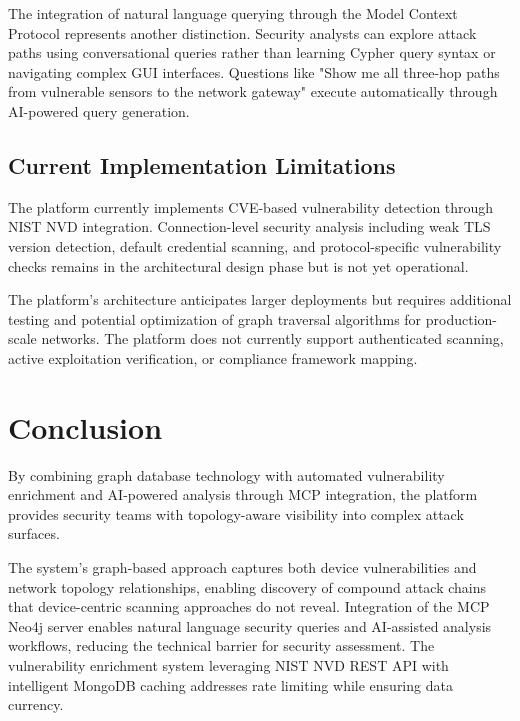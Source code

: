 \documentclass[11pt,a4paper]{article}
\begin{document}
The integration of natural language querying through the Model Context Protocol represents another distinction. Security analysts can explore attack paths using conversational queries rather than learning Cypher query syntax or navigating complex GUI interfaces. Questions like "Show me all three-hop paths from vulnerable sensors to the network gateway" execute automatically through AI-powered query generation.

\subsection{Current Implementation Limitations}

The platform currently implements CVE-based vulnerability detection through NIST NVD integration. Connection-level security analysis including weak TLS version detection, default credential scanning, and protocol-specific vulnerability checks remains in the architectural design phase but is not yet operational.

The platform's architecture anticipates larger deployments but requires additional testing and potential optimization of graph traversal algorithms for production-scale networks. The platform does not currently support authenticated scanning, active exploitation verification, or compliance framework mapping.

\section{Conclusion}

By combining graph database technology with automated vulnerability enrichment and AI-powered analysis through MCP integration, the platform provides security teams with topology-aware visibility into complex attack surfaces.

The system's graph-based approach captures both device vulnerabilities and network topology relationships, enabling discovery of compound attack chains that device-centric scanning approaches do not reveal. Integration of the MCP Neo4j server enables natural language security queries and AI-assisted analysis workflows, reducing the technical barrier for security assessment. The vulnerability enrichment system leveraging NIST NVD REST API with intelligent MongoDB caching addresses rate limiting while ensuring data currency.
\end{document}
